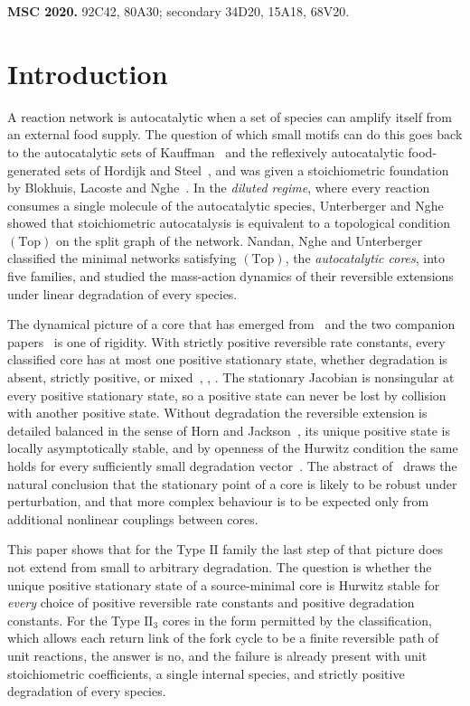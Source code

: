 \documentclass[11pt,a4paper]{article}
\theoremstyle{plain}
\theoremstyle{definition}
\theoremstyle{remark}
\numberwithin{equation}{section}
\newcommand{\II}{\mathrm{II}}
\newcommand{\Top}{\mathrm{(Top)}}
\begin{document}
\medskip
\noindent\textbf{MSC 2020.} 92C42, 80A30; secondary 34D20, 15A18, 68V20.

\section{Introduction}\label{sec:intro}

A reaction network is autocatalytic when a set of species can amplify itself from an external food supply. The question of which small motifs can do this goes back to the autocatalytic sets of Kauffman~\cite{Kau86} and the reflexively autocatalytic food-generated sets of Hordijk and Steel~\cite{HS04}, and was given a stoichiometric foundation by Blokhuis, Lacoste and Nghe~\cite{BLN20}. In the \emph{diluted regime}, where every reaction consumes a single molecule of the autocatalytic species, Unterberger and Nghe~\cite{UN22} showed that stoichiometric autocatalysis is equivalent to a topological condition $\Top$ on the split graph of the network. Nandan, Nghe and Unterberger~\cite{NNU26} classified the minimal networks satisfying $\Top$, the \emph{autocatalytic cores}, into five families, and studied the mass-action dynamics of their reversible extensions under linear degradation of every species.

The dynamical picture of a core that has emerged from~\cite{NNU26} and the two companion papers~\cite{TypeIIpos,TypeIImixed} is one of rigidity. With strictly positive reversible rate constants, every classified core has at most one positive stationary state, whether degradation is absent, strictly positive, or mixed~\cite[Theorems~4.1 and~5.2]{NNU26}, \cite{TypeIIpos}, \cite[Theorem~1.1]{TypeIImixed}. The stationary Jacobian is nonsingular at every positive stationary state, so a positive state can never be lost by collision with another positive state. Without degradation the reversible extension is detailed balanced in the sense of Horn and Jackson~\cite{HJ72}, its unique positive state is locally asymptotically stable, and by openness of the Hurwitz condition the same holds for every sufficiently small degradation vector~\cite[Proposition~8.4]{TypeIImixed}. The abstract of~\cite{NNU26} draws the natural conclusion that the stationary point of a core is likely to be robust under perturbation, and that more complex behaviour is to be expected only from additional nonlinear couplings between cores.

This paper shows that for the Type $\II$ family the last step of that picture does not extend from small to arbitrary degradation. The question is whether the unique positive stationary state of a source-minimal core is Hurwitz stable for \emph{every} choice of positive reversible rate constants and positive degradation constants. For the Type $\II_3$ cores in the form permitted by the classification, which allows each return link of the fork cycle to be a finite reversible path of unit reactions, the answer is no, and the failure is already present with unit stoichiometric coefficients, a single internal species, and strictly positive degradation of every species.
\end{document}
